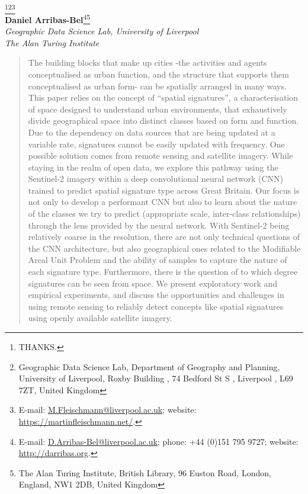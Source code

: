 \documentclass[pdftex,letterpaper,11pt]{article}%
\begin{document}
\begin{titlepage}
\vspace*{1ex}
\begin{minipage}{\textwidth}
\begin{center}%

    {}\\[4ex]%

{\Large{}\footnote[1]{THANKS.}\footnote[2]{Geographic
Data Science Lab, Department of Geography and Planning, University of
Liverpool, Roxby Building , 74 Bedford St S , Liverpool , L69 7ZT, United
Kingdom}\footnote[4]{
E-mail: \url{M.Fleischmann@liverpool.ac.uk}; website: \url{https://martinfleischmann.net/}.}}\\[1mm]
%
{\Large\textbf{Daniel Arribas-Bel}\footnotemark[1]\footnotemark[2]\footnote[3]{E-mail: \url{D.Arribas-Bel@liverpool.ac.uk}; phone: +44 (0)151 795 9727; website: \url{http://darribas.org}.
}}\footnote[5]{The Alan Turing Institute, British Library, 96 Euston Road, London, England, NW1 2DB, United Kingdom}
\\[1mm]
{\large\textit{Geographic Data Science Lab, University of Liverpool} }\\
{\large\textit{The Alan Turing Institute} }\\[2.5ex]
%
\date{\today}\vspace{1.5ex}
%
\end{center}
%
\begin{abstract}
The building blocks that make up cities -the activities and agents conceptualised as urban function, and the structure that supports them conceptualised as urban form- can be spatially arranged in many ways. This paper relies on the concept of ``spatial signatures'', a characterisation of space designed to understand urban environments, that exhaustively divide geographical space into distinct classes based on form and function. Due to the dependency on data sources that are being updated at a variable rate, signatures cannot be easily updated with frequency. One possible solution comes from remote sensing and satellite imagery. While staying in the realm of open data, we explore this pathway using the Sentinel-2 imagery within a deep convolutional neural network (CNN) trained to predict spatial signature type across Great Britain. Our focus is not only to develop a performant CNN but also to learn about the nature of the classes we try to predict (appropriate scale, inter-class relationships) through the lens provided by the neural network. With Sentinel-2 being relatively coarse in the resolution, there are not only technical questions of the CNN architecture, but also geographical ones related to the Modifiable Areal Unit Problem and the ability of samples to capture the nature of each signature type. Furthermore, there is the question of to which degree signatures can be seen from space. We present exploratory work and empirical experiments, and discuss the opportunities and challenges in using remote sensing to reliably detect concepts like spatial signatures using openly available satellite imagery.

\end{abstract}
\end{minipage}
\end{titlepage}
\end{document}
